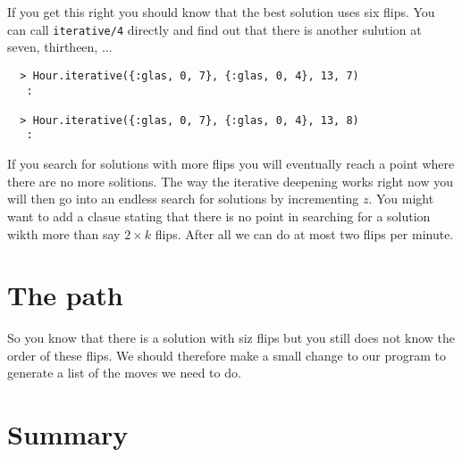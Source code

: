 \documentclass[a4paper,11pt]{article}
\begin{document}
If you get this right you should know that the best solution uses six
flips. You can call {\tt iterative/4} directly and find out that there
is another sulution at seven, thirtheen, ...

\begin{verbatim}
  > Hour.iterative({:glas, 0, 7}, {:glas, 0, 4}, 13, 7)
   :

  > Hour.iterative({:glas, 0, 7}, {:glas, 0, 4}, 13, 8)
   :
\end{verbatim}

If you search for solutions with more flips you will eventually reach
a point where there are no more solitions. The way the iterative
deepening works right now you will then go into an endless search for
solutions by incrementing $z$. You might want to add a clasue stating
that there is no point in searching for a solution wikth more than say
$2\times k$ flips. After all we can do at most two flips per minute.

 
\section*{The path}

So you know that there is a solution with siz flips but you still does
not know the order of these flips. We should therefore make a small
change to our program to generate a list of the moves we need to do.









\section*{Summary}


  
\end{document}
